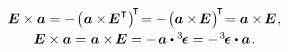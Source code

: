 \nopagebreak\vspace{-0.25em}\begin{equation}\begin{array}{c}
\UnitDyad \times \bm{a}
= - \hspace{.25ex} \bigl( \hspace{.1ex} \bm{a} \times \hspace{-0.25ex} \UnitDyad^{\hspace{.1ex}\T} \hspace{.1ex} \bigr)^{\hspace{-0.3ex}\T} \hspace{-0.4ex}
= - \hspace{.25ex} \bigl( \bm{a} \times \hspace{-0.25ex} \UnitDyad \hspace{.15ex} \bigr)^{\hspace{-0.25ex}\T} \hspace{-0.4ex}
= \bm{a} \times \hspace{-0.25ex} \UnitDyad
\hspace{.15ex} ,
\\[.25em]
%
\UnitDyad \times \bm{a} = \hspace{.1ex} \bm{a} \times \hspace{-0.25ex} \UnitDyad
= - \hspace{.25ex} \bm{a} \dotp \levicivitatensor
= - \hspace{.2ex} \levicivitatensor \dotp \bm{a}
\hspace{.2ex} .
\end{array}\end{equation}

